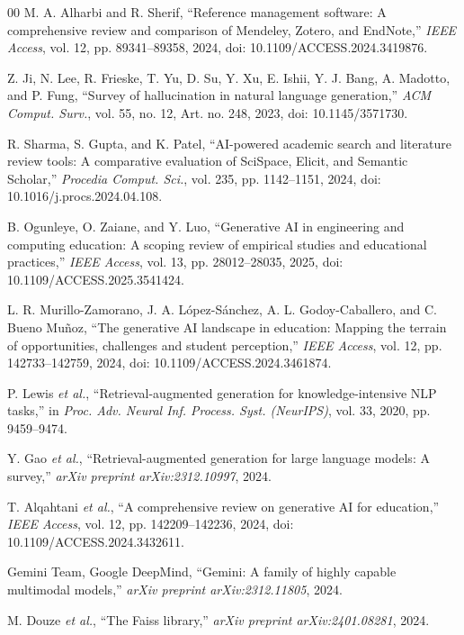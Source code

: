 \documentclass[conference]{IEEEtran}
\begin{document}
\begin{thebibliography}{00}
 M. A. Alharbi and R. Sherif, ``Reference management software: A comprehensive review and comparison of Mendeley, Zotero, and EndNote,'' \textit{IEEE Access}, vol. 12, pp. 89341--89358, 2024, doi: 10.1109/ACCESS.2024.3419876.

 Z. Ji, N. Lee, R. Frieske, T. Yu, D. Su, Y. Xu, E. Ishii, Y. J. Bang, A. Madotto, and P. Fung, ``Survey of hallucination in natural language generation,'' \textit{ACM Comput. Surv.}, vol. 55, no. 12, Art. no. 248, 2023, doi: 10.1145/3571730.

 R. Sharma, S. Gupta, and K. Patel, ``AI-powered academic search and literature review tools: A comparative evaluation of SciSpace, Elicit, and Semantic Scholar,'' \textit{Procedia Comput. Sci.}, vol. 235, pp. 1142--1151, 2024, doi: 10.1016/j.procs.2024.04.108.

 B. Ogunleye, O. Zaiane, and Y. Luo, ``Generative AI in engineering and computing education: A scoping review of empirical studies and educational practices,'' \textit{IEEE Access}, vol. 13, pp. 28012--28035, 2025, doi: 10.1109/ACCESS.2025.3541424.

 L. R. Murillo-Zamorano, J. A. L\'{o}pez-S\'{a}nchez, A. L. Godoy-Caballero, and C. Bueno Mu\~{n}oz, ``The generative AI landscape in education: Mapping the terrain of opportunities, challenges and student perception,'' \textit{IEEE Access}, vol. 12, pp. 142733--142759, 2024, doi: 10.1109/ACCESS.2024.3461874.

 P. Lewis \textit{et al.}, ``Retrieval-augmented generation for knowledge-intensive NLP tasks,'' in \textit{Proc. Adv. Neural Inf. Process. Syst. (NeurIPS)}, vol. 33, 2020, pp. 9459--9474.

 Y. Gao \textit{et al.}, ``Retrieval-augmented generation for large language models: A survey,'' \textit{arXiv preprint arXiv:2312.10997}, 2024.

 T. Alqahtani \textit{et al.}, ``A comprehensive review on generative AI for education,'' \textit{IEEE Access}, vol. 12, pp. 142209--142236, 2024, doi: 10.1109/ACCESS.2024.3432611.

 Gemini Team, Google DeepMind, ``Gemini: A family of highly capable multimodal models,'' \textit{arXiv preprint arXiv:2312.11805}, 2024.

 M. Douze \textit{et al.}, ``The Faiss library,'' \textit{arXiv preprint arXiv:2401.08281}, 2024.


\end{thebibliography}
\end{document}
